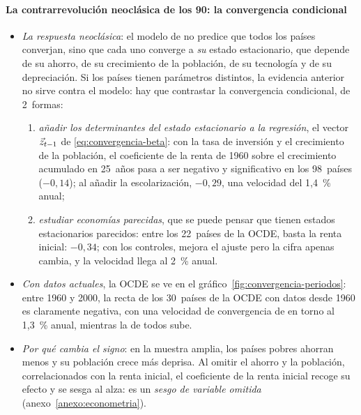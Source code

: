 \documentclass[11pt]{article}
\begin{document}
\paragraph{La contrarrevolución neoclásica de los 90: la convergencia condicional}

\begin{itemize}
\item \emph{La respuesta neoclásica}: el modelo de  no predice que todos los países converjan, sino que cada uno converge a \emph{su} estado estacionario, que depende de su ahorro, de su crecimiento de la población, de su tecnología y de su depreciación. Si los países tienen parámetros distintos, la evidencia anterior no sirve contra el modelo: hay que contrastar la convergencia condicional\nocite{BarroSalaiMartin1992,MankiwRomerWeil1992}, de 2~formas:
  \begin{enumerate}
  \item \emph{añadir los determinantes del estado estacionario a la regresión}, el vector $\vec{z}_{t-1}$ de \eqref{eq:convergencia-beta}: con la tasa de inversión y el crecimiento de la población, el coeficiente de la renta de 1960 sobre el crecimiento acumulado en 25~años pasa a ser negativo y significativo en los 98~países ($-0{,}14$); al añadir la escolarización, $-0{,}29$, una velocidad del 1,4~\% anual\nocite{MankiwRomerWeil1992};
  \item \emph{estudiar economías parecidas}, que se puede pensar que tienen estados estacionarios parecidos: entre los 22~países de la OCDE, basta la renta inicial: $-0{,}34$; con los controles, mejora el ajuste pero la cifra apenas cambia, y la velocidad llega al 2~\% anual\nocite{MankiwRomerWeil1992}.
  \end{enumerate}
\item \emph{Con datos actuales}, la OCDE se ve en el gráfico~\ref{fig:convergencia-periodos}: entre 1960 y 2000, la recta de los 30~países de la OCDE con datos desde 1960 es claramente negativa, con una velocidad de convergencia de en torno al 1,3~\% anual, mientras la de todos sube\nocite{GGDC2025PWT}.
\item \emph{Por qué cambia el signo}: en la muestra amplia, los países pobres ahorran menos y su población crece más deprisa. Al omitir el ahorro y la población, correlacionados con la renta inicial, el coeficiente de la renta inicial recoge su efecto y se sesga al alza: es un \emph{sesgo de variable omitida} (anexo~\ref{anexo:econometria}).
\end{itemize}
\end{document}
